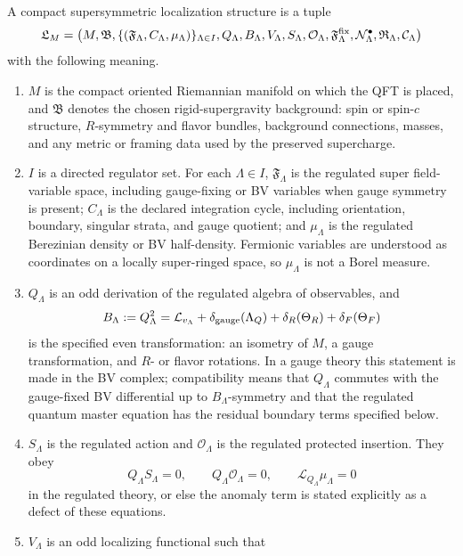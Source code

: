 \begin{definition}
\label{def:compact-supersymmetric-localization-datum}
A compact supersymmetric localization structure is a tuple
\[
  \mathfrak L_M
  =
  \bigl(
    M,\mathfrak B,
    \{(\mathfrak F_\Lambda,C_\Lambda,\mu_\Lambda)\}_{\Lambda\in I},
    Q_\Lambda,B_\Lambda,V_\Lambda,
    S_\Lambda,\mathcal O_\Lambda,
    \mathfrak F^{\rm fix}_\Lambda,
    \mathcal N^{\bullet}_\Lambda,
    \mathfrak R_\Lambda,
    \mathcal C_\Lambda
  \bigr)
\]
with the following meaning.
\begin{enumerate}[label=(\roman*)]
\item \(M\) is the compact oriented Riemannian manifold on which the QFT is
placed, and \(\mathfrak B\) denotes the chosen rigid-supergravity background:
spin or spin-\(c\) structure, \(R\)-symmetry and flavor bundles, background
connections, masses, and any metric or framing data used by the preserved
supercharge.
\item \(I\) is a directed regulator set.  For each \(\Lambda\in I\),
\(\mathfrak F_\Lambda\) is the regulated super field-variable space, including
gauge-fixing or BV variables when gauge symmetry is present; \(C_\Lambda\) is
the declared integration cycle, including orientation, boundary, singular
strata, and gauge quotient; and \(\mu_\Lambda\) is the regulated Berezinian
density or BV half-density.  Fermionic variables are understood as coordinates
on a locally super-ringed space, so \(\mu_\Lambda\) is not a Borel measure.
\item \(Q_\Lambda\) is an odd derivation of the regulated algebra of
observables, and
\[
  B_\Lambda:=Q_\Lambda^2
  =
  \mathcal L_{v_\Lambda}
  +\delta_{\rm gauge}(\Lambda_Q)
  +\delta_R(\Theta_R)+\delta_F(\Theta_F)
\]
is the specified even transformation: an isometry of \(M\), a gauge
transformation, and \(R\)- or flavor rotations.  In a gauge theory this
statement is made in the BV complex; compatibility means that \(Q_\Lambda\)
commutes with the gauge-fixed BV differential up to \(B_\Lambda\)-symmetry and
that the regulated quantum master equation has the residual boundary terms
specified below.
\item \(S_\Lambda\) is the regulated action and \(\mathcal O_\Lambda\) is the
regulated protected insertion.  They obey
\[
  Q_\Lambda S_\Lambda=0,\qquad
  Q_\Lambda\mathcal O_\Lambda=0,\qquad
  \mathcal L_{Q_\Lambda}\mu_\Lambda=0
\]
in the regulated theory, or else the anomaly term is stated explicitly as a
defect of these equations.
\item \(V_\Lambda\) is an odd localizing functional such that

\end{enumerate}
\end{definition}
